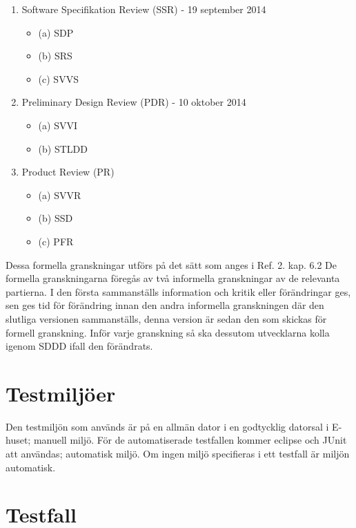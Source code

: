\documentclass[a4paper]{article}
\begin{document}
\begin{enumerate}


\item Software Specifikation Review (SSR) - 19 september 2014
\begin{itemize}
\item [](a) SDP
\item [](b) SRS
\item [](c) SVVS
\end{itemize}


\item Preliminary Design Review (PDR) - 10 oktober 2014
\begin{itemize}
\item [](a) SVVI
\item [](b) STLDD
\end{itemize}


\item Product Review (PR)
\begin{itemize}
\item [](a) SVVR
\item [](b) SSD
\item [](c) PFR
\end{itemize}


\end{enumerate}

Dessa formella granskningar utförs på det sätt som anges i Ref. 2. kap. 6.2 De formella granskningarna föregås av två informella granskningar av de relevanta partierna. I den första sammanställs information och kritik eller förändringar ges, sen ges tid för förändring innan den andra informella granskningen där den slutliga versionen sammanställs, denna version är sedan den som skickas för formell granskning. Inför varje granskning så ska dessutom utvecklarna kolla igenom SDDD ifall den förändrats.


\section{Testmiljöer}

Den testmiljön som används är på en allmän dator i en godtycklig datorsal i E-huset; 
manuell miljö. För de automatiserade testfallen kommer eclipse och JUnit att användas;
automatisk miljö. Om ingen miljö specifieras i ett testfall är miljön automatisk.

\section{Testfall}
\end{document}
